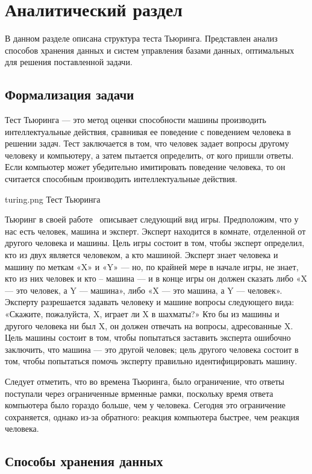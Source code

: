 \section{Аналитический раздел}

В данном разделе описана структура теста Тьюринга.  
Представлен анализ способов хранения данных и систем управления базами данных, оптимальных для решения поставленной задачи. 

\subsection{Формализация задачи}
Тест Тьюринга --- это метод оценки способности машины производить интеллектуальные действия, сравнивая ее поведение с поведением человека в решении задач. 
Тест заключается в том, что человек задает вопросы другому человеку и компьютеру, а затем пытается определить, от кого пришли ответы. 
Если компьютер может убедительно имитировать поведение человека, то он считается способным производить интеллектуальные действия.

\img{100mm}
{turing.png}
{Тест Тьюринга}

Тьюринг в своей работе~\cite{10.1093/mind/LIX.236.433} описывает следующий вид игры. Предположим, что у нас есть человек, машина и эксперт. Эксперт находится в комнате, отделенной от другого человека и машины. Цель игры состоит в том, чтобы эксперт определил, кто из двух является человеком, а кто машиной. Эксперт знает человека и машину по меткам «X» и «Y» --- но, по крайней мере в начале игры, не знает, кто из них человек и кто -- машина --- и в конце игры он должен сказать либо «X --- это человек, а Y --- машина», либо «X --- это машина, а Y --- человек».
Эксперту разрешается задавать человеку и машине вопросы следующего вида: «Скажите, пожалуйста, X, играет ли X в шахматы?» Кто бы из машины и другого человека ни был X, он должен отвечать на вопросы, адресованные X. Цель машины состоит в том, чтобы попытаться заставить эксперта ошибочно заключить, что машина --- это другой человек; цель другого человека состоит в том, чтобы попытаться помочь эксперту правильно идентифицировать машину.~\cite{sep-turing-test}

Следует отметить, что во времена Тьюринга, было ограничение, что ответы поступали через ограниченные врменные рамки, поскольку время ответа компьютера было гораздо больше, чем у человека. 
Сегодня это ограничение сохраняется, однако из-за обратного: реакция компьютера быстрее, чем реакция человека.

\subsection{Способы хранения данных}

